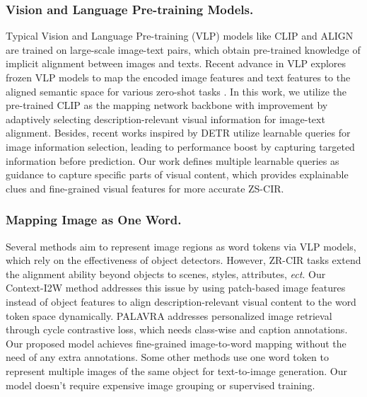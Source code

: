 \documentclass[letterpaper]{article} \usepackage{aaai24}  \usepackage{times}  \usepackage{helvet}  \usepackage{courier}  \usepackage[hyphens]{url}  \usepackage{graphicx} \urlstyle{rm} \def\UrlFont{\rm}  \usepackage{natbib}  \usepackage{caption} \frenchspacing  \setlength{\pdfpagewidth}{8.5in} \setlength{\pdfpageheight}{11in} \usepackage{algorithm}
\begin{document}
\subsubsection{Vision and Language Pre-training Models.} Typical Vision and Language Pre-training (VLP) models like CLIP \cite{radford2021learning} and ALIGN \cite{NEURIPS2021_50525975} are trained on large-scale image-text pairs, which obtain pre-trained knowledge of implicit alignment between images and texts. Recent advance in VLP \cite{ Zhou_2022_CVPR, song2022clip} explores frozen VLP models to map the encoded image features and text features to the aligned semantic space for various zero-shot tasks \cite{pmlr-v162-li22n,song2022clip}. In this work, we utilize the pre-trained CLIP as the mapping network backbone with improvement by adaptively selecting description-relevant visual information for image-text alignment. Besides, recent works \cite{NEURIPS2022_960a172b, li2023blip2} inspired by DETR \cite{carion2020end} utilize learnable queries for image information selection, leading to performance boost by capturing targeted information before prediction. Our work defines multiple learnable queries as guidance to capture specific parts of visual content, which provides explainable clues and fine-grained visual features for more accurate ZS-CIR.

\subsubsection{Mapping Image as One Word.} Several methods \cite{su2020vl-bert, Li_Duan_Fang_Gong_Jiang_2020, li2020oscar, zhang2021vinvl} aim to represent image regions as word tokens via VLP models, which rely on the effectiveness of object detectors. However, ZR-CIR tasks extend the alignment ability beyond objects to scenes, styles, attributes, \textit{ect}. Our Context-I2W method addresses this issue by using patch-based image features instead of object features to align description-relevant visual content to the word token space dynamically. PALAVRA \cite{10.1007/978-3-031-20044-1_32} addresses personalized image retrieval through cycle contrastive loss, which needs class-wise and caption annotations. Our proposed model achieves fine-grained image-to-word mapping without the need of any extra annotations. Some other methods \cite{gal2022image, Kumari_2023_CVPR} use one word token to represent multiple images of the same object for text-to-image generation. Our model doesn't require expensive image grouping or supervised training.
\end{document}
